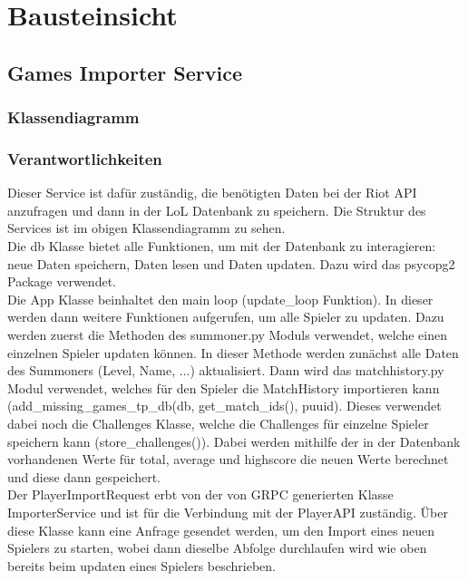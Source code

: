 \section{Bausteinsicht}

\subsection{Games Importer Service}
\subsubsection{Klassendiagramm}
\subsubsection{Verantwortlichkeiten}
Dieser Service ist dafür zuständig, die benötigten Daten bei der Riot API anzufragen und dann in der LoL Datenbank zu speichern. Die Struktur des Services ist im obigen Klassendiagramm zu sehen. \\
Die db Klasse bietet alle Funktionen, um mit der Datenbank zu interagieren: neue Daten speichern, Daten lesen und Daten updaten. Dazu wird das psycopg2 Package verwendet.\\
Die App Klasse beinhaltet den main loop (update\_loop Funktion). In dieser werden dann weitere Funktionen aufgerufen, um alle Spieler zu updaten. Dazu werden zuerst die Methoden des summoner.py Moduls verwendet, welche einen einzelnen Spieler updaten können. In dieser Methode werden zunächst alle Daten des Summoners (Level, Name, ...) aktualisiert. Dann wird das matchhistory.py Modul verwendet, welches für den Spieler die MatchHistory importieren kann (add\_missing\_games\_tp\_db(db, get\_match\_ids(), puuid). Dieses verwendet dabei noch die Challenges Klasse, welche die Challenges für einzelne Spieler speichern kann (store\_challenges()). Dabei werden mithilfe der in der Datenbank vorhandenen Werte für total, average und highscore die neuen Werte berechnet und diese dann gespeichert.\\

Der PlayerImportRequest erbt von der von GRPC generierten Klasse ImporterService und ist für die Verbindung mit der PlayerAPI zuständig. Über diese Klasse kann eine Anfrage gesendet werden, um den Import eines neuen Spielers zu starten, wobei dann dieselbe Abfolge durchlaufen wird wie oben bereits beim updaten eines Spielers beschrieben.

